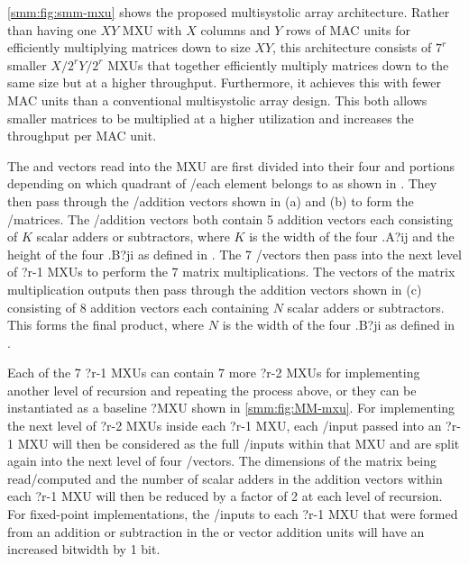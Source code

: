 \Figure \ref{smm:fig:smm-mxu} shows the proposed \smmArch multisystolic array architecture.
Rather than having one $X$\by$Y$ MXU with $X$ columns and $Y$ rows of MAC units for efficiently multiplying matrices down to size $X$\by$Y$, this architecture consists of $7^r$ smaller $X/2^r$\by$Y/2^r$ MXUs that together efficiently multiply matrices down to the same size but at a higher throughput.
Furthermore, it achieves this with fewer MAC units than a conventional multisystolic array design.
This both allows smaller matrices to be multiplied at a higher utilization and increases the throughput per MAC unit.

The \Av and \Bv vectors read into the MXU are first divided into their four \Anv and \Bnv portions depending on which quadrant of \A/\B each element belongs to as shown in .
They then pass through the \A/\B addition vectors shown in  (a) and (b) to form the \Tv/\Sv matrices.
The \A/\B addition vectors both contain 5 addition vectors each consisting of $K$ scalar adders or subtractors, where $K$ is the width of the four \m.A?{ij} \blocks and the height of the four \m.B?{ji} \blocks as defined in .
The 7 \Tv/\Sv vectors then pass into the next level of \smmArch?{r-1} MXUs to perform the 7 matrix \block multiplications.
The \Qv vectors of the matrix \block multiplication outputs then pass through the \Qv addition vectors shown in  (c) consisting of 8 addition vectors each containing $N$ scalar adders or subtractors.
This forms the final \C product, where $N$ is the width of the four \m.B?{ji} \blocks as defined in .

Each of the 7 \smmArch?{r-1} MXUs can contain 7 more \smmArch?{r-2} MXUs for implementing another level of \s recursion and repeating the process above, or they can be instantiated as a baseline \mmArch?\zero MXU shown in \Figure \ref{smm:fig:MM-mxu}.
For implementing the next level of \smmArch?{r-2} MXUs inside each \smmArch?{r-1} MXU, each \Tv/\Sv input passed into an \smmArch?{r-1} MXU will then be considered as the full \Av/\Bv inputs within that MXU and are split again into the next level of four \Anv/\Bnv vectors.
The dimensions of the matrix \blocks being read/computed and the number of scalar adders in the addition vectors within each \smmArch?{r-1} MXU will then be reduced by a factor of 2 at each level of recursion.
For fixed-point implementations, the \Tv/\Sv inputs to each \smmArch?{r-1} MXU that were formed from an addition or subtraction in the \A or \B vector addition units will have an increased bitwidth by 1 bit.


